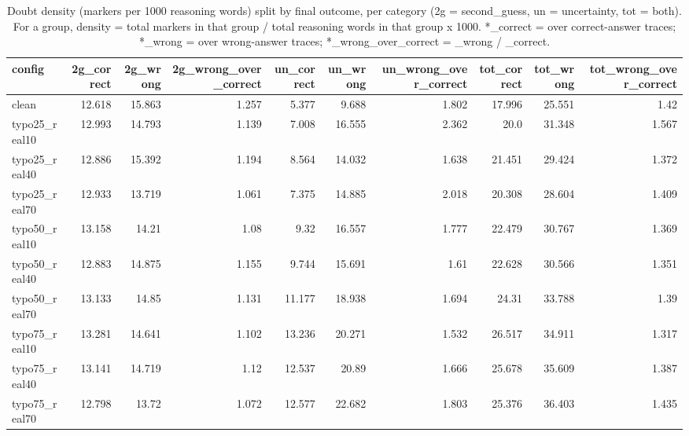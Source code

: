 \documentclass[11pt]{article}
\begin{document}
\begin{table}[H]
\centering
\caption{Doubt density (markers per 1000 reasoning words) split by final outcome, per category (2g = second\_guess, un = uncertainty, tot = both). For a group, density = total markers in that group / total reasoning words in that group x 1000. *\_correct = over correct-answer traces; *\_wrong = over wrong-answer traces; *\_wrong\_over\_correct = \_wrong / \_correct.}
\small
\begin{adjustbox}{max width=\textwidth}
\begin{tabular}{lrrrrrrrrr}
\toprule
\textbf{config} & \textbf{2g\_correct} & \textbf{2g\_wrong} & \textbf{2g\_wrong\_over\_correct} & \textbf{un\_correct} & \textbf{un\_wrong} & \textbf{un\_wrong\_over\_correct} & \textbf{tot\_correct} & \textbf{tot\_wrong} & \textbf{tot\_wrong\_over\_correct} \\
\midrule
clean & 12.618 & 15.863 & 1.257 & 5.377 & 9.688 & 1.802 & 17.996 & 25.551 & 1.42 \\
typo25\_real10 & 12.993 & 14.793 & 1.139 & 7.008 & 16.555 & 2.362 & 20.0 & 31.348 & 1.567 \\
typo25\_real40 & 12.886 & 15.392 & 1.194 & 8.564 & 14.032 & 1.638 & 21.451 & 29.424 & 1.372 \\
typo25\_real70 & 12.933 & 13.719 & 1.061 & 7.375 & 14.885 & 2.018 & 20.308 & 28.604 & 1.409 \\
typo50\_real10 & 13.158 & 14.21 & 1.08 & 9.32 & 16.557 & 1.777 & 22.479 & 30.767 & 1.369 \\
typo50\_real40 & 12.883 & 14.875 & 1.155 & 9.744 & 15.691 & 1.61 & 22.628 & 30.566 & 1.351 \\
typo50\_real70 & 13.133 & 14.85 & 1.131 & 11.177 & 18.938 & 1.694 & 24.31 & 33.788 & 1.39 \\
typo75\_real10 & 13.281 & 14.641 & 1.102 & 13.236 & 20.271 & 1.532 & 26.517 & 34.911 & 1.317 \\
typo75\_real40 & 13.141 & 14.719 & 1.12 & 12.537 & 20.89 & 1.666 & 25.678 & 35.609 & 1.387 \\
typo75\_real70 & 12.798 & 13.72 & 1.072 & 12.577 & 22.682 & 1.803 & 25.376 & 36.403 & 1.435 \\
\bottomrule
\end{tabular}
\end{adjustbox}
\end{table}
\end{document}
